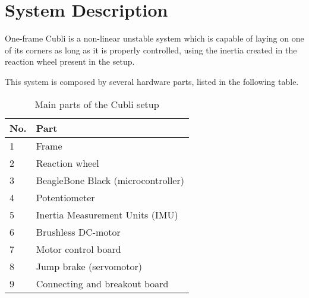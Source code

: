 \chapter{System Description}\label{systemDescription}
One-frame Cubli is a non-linear unstable system which is capable of laying on one of its corners as long as it is properly controlled, using the inertia created in the reaction wheel present in the setup.



This system is composed by several hardware parts, listed in the following table. 

\begin{table}[H]
	\begin{tabular}{|l|p{6.7cm}|}
		\hline %
		\textbf{No.} &\textbf{Part} 			\\
		\hline %
		1            & Frame           			\\
		\hline %
		2            & Reaction wheel      		\\
		\hline %
		3            & BeagleBone Black (microcontroller)  \\
		\hline %
		4            & Potentiometer			\\
		\hline %
		5            & Inertia Measurement Units (IMU)       			\\
		\hline %
		6            & Brushless DC-motor   	\\
		\hline %
		7            & Motor control board     	\\
		\hline %
		8            & Jump brake (servomotor)		    	\\
		\hline %
		9            & Connecting and breakout board		    	\\
		\hline %
	\end{tabular}
	\caption{Main parts of the Cubli setup}
\label{TableAAUCubliComponent}
\end{table}

